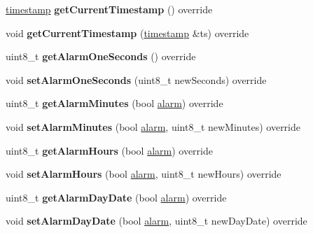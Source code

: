 \begin{DoxyCompactItemize}
\mbox{\hyperlink{classtimestamp}{timestamp}} {\bfseries get\+Current\+Timestamp} () override
\item 
\mbox{\label{class_d_s3231_ad94d54ed265fb5b911b4281f0103b0b0}} 
void {\bfseries get\+Current\+Timestamp} (\mbox{\hyperlink{classtimestamp}{timestamp}} \&ts) override
\item 
\mbox{\label{class_d_s3231_afd2b16482de8abc10981fdfca0e181a6}} 
uint8\+\_\+t {\bfseries get\+Alarm\+One\+Seconds} () override
\item 
\mbox{\label{class_d_s3231_ae294f3c8c8634a058846cf9864ccc5c8}} 
void {\bfseries set\+Alarm\+One\+Seconds} (uint8\+\_\+t new\+Seconds) override
\item 
\mbox{\label{class_d_s3231_ae11a0dcc34e9c8a9b875989172339957}} 
uint8\+\_\+t {\bfseries get\+Alarm\+Minutes} (bool \mbox{\hyperlink{classalarm}{alarm}}) override
\item 
\mbox{\label{class_d_s3231_a9c1f5b183c24f3062c1c8c299f46023c}} 
void {\bfseries set\+Alarm\+Minutes} (bool \mbox{\hyperlink{classalarm}{alarm}}, uint8\+\_\+t new\+Minutes) override
\item 
\mbox{\label{class_d_s3231_a8dc2f4546600209d16f109764c2f4434}} 
uint8\+\_\+t {\bfseries get\+Alarm\+Hours} (bool \mbox{\hyperlink{classalarm}{alarm}}) override
\item 
\mbox{\label{class_d_s3231_a0bcc7e2285869ffbe29d19c593f5a447}} 
void {\bfseries set\+Alarm\+Hours} (bool \mbox{\hyperlink{classalarm}{alarm}}, uint8\+\_\+t new\+Hours) override
\item 
\mbox{\label{class_d_s3231_a0b013c68f96b5145c1c9feb9270855a7}} 
uint8\+\_\+t {\bfseries get\+Alarm\+Day\+Date} (bool \mbox{\hyperlink{classalarm}{alarm}}) override
\item 
\mbox{\label{class_d_s3231_aa2048cc766ca58f707e84cbc564c1276}} 
void {\bfseries set\+Alarm\+Day\+Date} (bool \mbox{\hyperlink{classalarm}{alarm}}, uint8\+\_\+t new\+Day\+Date) override
\item 
\mbox{\label{class_d_s3231_a2e023e091c63208290e275874552a716}} 

\end{DoxyCompactItemize}
